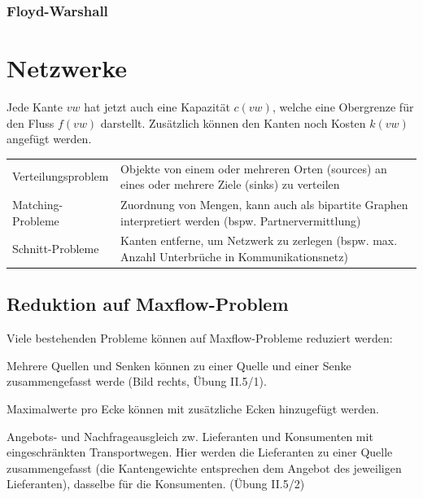 \subsubsection{Floyd-Warshall}



%
%
\section{Netzwerke}
Jede Kante $vw$ hat jetzt auch eine Kapazität $c(vw)$, welche eine Obergrenze für den Fluss $f(vw)$ darstellt. Zusätzlich können den Kanten noch Kosten $k(vw)$ angefügt werden.
  
  \begin{tabularx}{\textwidth}{l X}
    Verteilungsproblem
      & Objekte von einem oder mehreren Orten (sources) an eines oder mehrere Ziele (sinks) zu verteilen\\
    Matching-Probleme
      & Zuordnung von Mengen, kann auch als bipartite Graphen interpretiert werden (bspw. Partnervermittlung) \\
    Schnitt-Probleme
      & Kanten entferne, um Netzwerk zu zerlegen (bspw. max. Anzahl Unterbrüche in Kommunikationsnetz)\\
  \end{tabularx}

\subsection{Reduktion auf Maxflow-Problem}

Viele bestehenden Probleme können auf Maxflow-Probleme reduziert werden:
    
    \begin{liste}
      \item Mehrere Quellen und Senken können zu einer Quelle und einer Senke zusammengefasst werde (Bild rechts, Übung II.5/1).
      \item Maximalwerte pro Ecke können mit zusätzliche Ecken hinzugefügt werden.
      \item Angebots- und Nachfrageausgleich zw. Lieferanten und Konsumenten mit eingeschränkten Transportwegen. Hier werden die Lieferanten zu einer Quelle zusammengefasst (die Kantengewichte entsprechen dem Angebot des jeweiligen Lieferanten), dasselbe für die Konsumenten. (Übung II.5/2)
    \end{liste}

